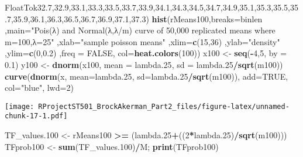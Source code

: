 \documentclass[
]{article}
\newenvironment{Shaded}{\begin{snugshade}}{\end{snugshade}}
\newcommand{\DataTypeTok}[1]{\textcolor[rgb]{0.13,0.29,0.53}{#1}}
\newcommand{\DecValTok}[1]{\textcolor[rgb]{0.00,0.00,0.81}{#1}}
\newcommand{\FloatTok}[1]{\textcolor[rgb]{0.00,0.00,0.81}{#1}}
\newcommand{\KeywordTok}[1]{\textcolor[rgb]{0.13,0.29,0.53}{\textbf{#1}}}
\newcommand{\NormalTok}[1]{#1}
\newcommand{\OperatorTok}[1]{\textcolor[rgb]{0.81,0.36,0.00}{\textbf{#1}}}
\newcommand{\OtherTok}[1]{\textcolor[rgb]{0.56,0.35,0.01}{#1}}
\newcommand{\StringTok}[1]{\textcolor[rgb]{0.31,0.60,0.02}{#1}}
\begin{document}
\begin{Shaded}
\begin{Highlighting}[]
FloatTok{32.7}\NormalTok{,}\FloatTok{32.9}\NormalTok{,}\FloatTok{33.1}\NormalTok{,}\FloatTok{33.3}\NormalTok{,}\FloatTok{33.5}\NormalTok{,}\FloatTok{33.7}\NormalTok{,}\FloatTok{33.9}\NormalTok{,}\FloatTok{34.1}\NormalTok{,}\FloatTok{34.3}\NormalTok{,}\FloatTok{34.5}\NormalTok{,}\FloatTok{34.7}\NormalTok{,}\FloatTok{34.9}\NormalTok{,}\FloatTok{35.1}\NormalTok{,}\FloatTok{35.3}\NormalTok{,}\FloatTok{35.5}\NormalTok{,}\FloatTok{35.7}\NormalTok{,}\FloatTok{35.9}\NormalTok{,}\FloatTok{36.1}\NormalTok{,}\FloatTok{36.3}\NormalTok{,}\FloatTok{36.5}\NormalTok{,}\FloatTok{36.7}\NormalTok{,}\FloatTok{36.9}\NormalTok{,}\FloatTok{37.1}\NormalTok{,}\FloatTok{37.3}\NormalTok{)}
\KeywordTok{hist}\NormalTok{(rMeans100,}\DataTypeTok{breaks=}\NormalTok{binlen ,}\DataTypeTok{main=}\StringTok{"Pois(λ) and Normal(λ,λ/m) curve of 50,000 replicated means where m=100,λ=25"}\NormalTok{  ,}\DataTypeTok{xlab=}\StringTok{"sample poisson means"}\NormalTok{ ,}\DataTypeTok{xlim=}\KeywordTok{c}\NormalTok{(}\DecValTok{15}\NormalTok{,}\DecValTok{36}\NormalTok{) ,}\DataTypeTok{ylab=}\StringTok{"density"}\NormalTok{ ,}\DataTypeTok{ylim=}\KeywordTok{c}\NormalTok{(}\DecValTok{0}\NormalTok{,}\FloatTok{0.2}\NormalTok{) ,}\DataTypeTok{freq =} \OtherTok{FALSE}\NormalTok{, }\DataTypeTok{col=}\KeywordTok{heat.colors}\NormalTok{(}\DecValTok{100}\NormalTok{))}
\NormalTok{x100 <-}\StringTok{ }\KeywordTok{seq}\NormalTok{(}\OperatorTok{-}\DecValTok{4}\NormalTok{,}\DecValTok{5}\NormalTok{, }\DataTypeTok{by =} \FloatTok{0.1}\NormalTok{)}
\NormalTok{y100 <-}\StringTok{ }\KeywordTok{dnorm}\NormalTok{(x100, }\DataTypeTok{mean =}\NormalTok{ lambda}\FloatTok{.25}\NormalTok{, }\DataTypeTok{sd =}\NormalTok{ lambda}\FloatTok{.25}\OperatorTok{/}\KeywordTok{sqrt}\NormalTok{(m100))}
\KeywordTok{curve}\NormalTok{(}\KeywordTok{dnorm}\NormalTok{(x, }\DataTypeTok{mean=}\NormalTok{lambda}\FloatTok{.25}\NormalTok{, }\DataTypeTok{sd=}\NormalTok{lambda}\FloatTok{.25}\OperatorTok{/}\KeywordTok{sqrt}\NormalTok{(m100)), }\DataTypeTok{add=}\OtherTok{TRUE}\NormalTok{, }\DataTypeTok{col=}\StringTok{"blue"}\NormalTok{, }\DataTypeTok{lwd=}\DecValTok{2}\NormalTok{)}
\end{Highlighting}
\end{Shaded}

\texttt{[image: RProjectST501\_BrockAkerman\_Part2\_files/figure-latex/unnamed-chunk-17-1.pdf]}

\begin{Shaded}
\begin{Highlighting}[]
\NormalTok{TF_values}\FloatTok{.100}\NormalTok{ <-}\StringTok{ }\NormalTok{rMeans100 }\OperatorTok{>=}\StringTok{ }\NormalTok{(lambda}\FloatTok{.25}\OperatorTok{+}\NormalTok{((}\DecValTok{2}\OperatorTok{*}\NormalTok{lambda}\FloatTok{.25}\NormalTok{)}\OperatorTok{/}\KeywordTok{sqrt}\NormalTok{(m100)))}
\NormalTok{TFprob100 <-}\StringTok{ }\KeywordTok{sum}\NormalTok{(TF_values}\FloatTok{.100}\NormalTok{)}\OperatorTok{/}\NormalTok{M; }\KeywordTok{print}\NormalTok{(TFprob100)}
\end{Highlighting}
\end{Shaded}
\end{document}

